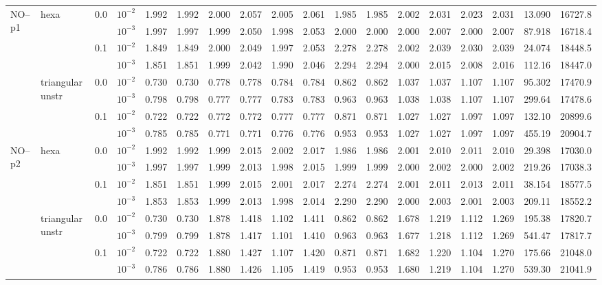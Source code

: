 \begin{longtable}{llclrrrrrrrrrrrrrr}
\multirow{8}{*}{NO--p1} & \multirow{4}{*}{hexa} & \multirow{2}{*}{0.0} & $10^{-2}$ & 1.992 & 1.992 & 2.000 & 2.057 & 2.005 & 2.061 & 1.985 & 1.985 & 2.002 & 2.031 & 2.023 & 2.031 & 13.090 & 16727.8 \\
& & & $10^{-3}$ & 1.997 & 1.997 & 1.999 & 2.050 & 1.998 & 2.053 & 2.000 & 2.000 & 2.000 & 2.007 & 2.000 & 2.007 & 87.918 & 16718.4 \\\cline{3-18}
& & \multirow{2}{*}{0.1} & $10^{-2}$ & 1.849 & 1.849 & 2.000 & 2.049 & 1.997 & 2.053 & 2.278 & 2.278 & 2.002 & 2.039 & 2.030 & 2.039 & 24.074 & 18448.5 \\
& & & $10^{-3}$ & 1.851 & 1.851 & 1.999 & 2.042 & 1.990 & 2.046 & 2.294 & 2.294 & 2.000 & 2.015 & 2.008 & 2.016 & 112.16 & 18447.0 \\\cline{2-18}
& \multirow{4}{*}{triangular unstr} & \multirow{2}{*}{0.0} & $10^{-2}$ & 0.730 & 0.730 & 0.778 & 0.778 & 0.784 & 0.784 & 0.862 & 0.862 & 1.037 & 1.037 & 1.107 & 1.107 & 95.302 & 17470.9 \\
& & & $10^{-3}$ & 0.798 & 0.798 & 0.777 & 0.777 & 0.783 & 0.783 & 0.963 & 0.963 & 1.038 & 1.038 & 1.107 & 1.107 & 299.64 & 17478.6 \\\cline{3-18}
& & \multirow{2}{*}{0.1} & $10^{-2}$ & 0.722 & 0.722 & 0.772 & 0.772 & 0.777 & 0.777 & 0.871 & 0.871 & 1.027 & 1.027 & 1.097 & 1.097 & 132.10 & 20899.6 \\
& & & $10^{-3}$ & 0.785 & 0.785 & 0.771 & 0.771 & 0.776 & 0.776 & 0.953 & 0.953 & 1.027 & 1.027 & 1.097 & 1.097 & 455.19 & 20904.7 \\\hline

\multirow{8}{*}{NO--p2} & \multirow{4}{*}{hexa} & \multirow{2}{*}{0.0} & $10^{-2}$ & 1.992 & 1.992 & 1.999 & 2.015 & 2.002 & 2.017 & 1.986 & 1.986 & 2.001 & 2.010 & 2.011 & 2.010 & 29.398 & 17030.0 \\
& & & $10^{-3}$ & 1.997 & 1.997 & 1.999 & 2.013 & 1.998 & 2.015 & 1.999 & 1.999 & 2.000 & 2.002 & 2.000 & 2.002 & 219.26 & 17038.3 \\\cline{3-18}
& & \multirow{2}{*}{0.1} & $10^{-2}$ & 1.851 & 1.851 & 1.999 & 2.015 & 2.001 & 2.017 & 2.274 & 2.274 & 2.001 & 2.011 & 2.013 & 2.011 & 38.154 & 18577.5 \\
& & & $10^{-3}$ & 1.853 & 1.853 & 1.999 & 2.013 & 1.998 & 2.014 & 2.290 & 2.290 & 2.000 & 2.003 & 2.001 & 2.003 & 209.11 & 18552.2 \\\cline{2-18}
& \multirow{4}{*}{triangular unstr} & \multirow{2}{*}{0.0} & $10^{-2}$ & 0.730 & 0.730 & 1.878 & 1.418 & 1.102 & 1.411 & 0.862 & 0.862 & 1.678 & 1.219 & 1.112 & 1.269 & 195.38 & 17820.7 \\
& & & $10^{-3}$ & 0.799 & 0.799 & 1.878 & 1.417 & 1.101 & 1.410 & 0.963 & 0.963 & 1.677 & 1.218 & 1.112 & 1.269 & 541.47 & 17817.7 \\\cline{3-18}
& & \multirow{2}{*}{0.1} & $10^{-2}$ & 0.722 & 0.722 & 1.880 & 1.427 & 1.107 & 1.420 & 0.871 & 0.871 & 1.682 & 1.220 & 1.104 & 1.270 & 175.66 & 21048.0 \\
& & & $10^{-3}$ & 0.786 & 0.786 & 1.880 & 1.426 & 1.105 & 1.419 & 0.953 & 0.953 & 1.680 & 1.219 & 1.104 & 1.270 & 539.30 & 21041.9 \\\hline


\end{longtable}
